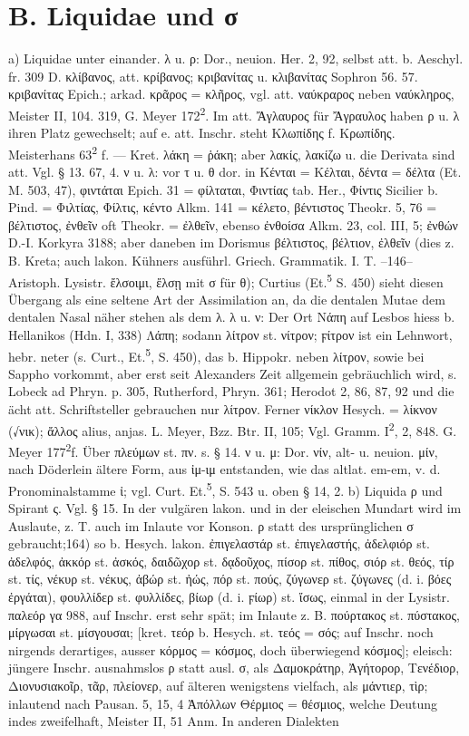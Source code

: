 \section{B. Liquidae und σ}
a) Liquidae unter einander. λ u. ρ: Dor., neuion. Her. 2, 92, selbst att. b. Aeschyl. fr. 309 D. κλίβανος, att. κρίβανος; κριβανίτας u. κλιβανίτας Sophron 56. 57. κριβανίτας Epich.; arkad. κρᾶρος = κλῆρος, vgl. att. ναύκραρος neben ναύκληρος, Meister II, 104. 319, G. Meyer 172\textsuperscript{2}. Im att. Ἄγλαυρος für Ἄγραυλος haben ρ u. λ ihren Platz gewechselt; auf e. att. Inschr. steht Κλωπίδης f. Κρωπίδης. Meisterhans 63\textsuperscript{2} f. — Kret. λάκη = ῥάκη; aber λακίς, λακίζω u. die Derivata sind att. Vgl. § 13. 67, 4. ν u. λ: vor τ u. θ dor. in Κένται = Κέλται, δέντα = δέλτα (Et. M. 503, 47), φιντάται Epich. 31 = φίλταται, Φιντίας tab. Her., Φίντις Sicilier b. Pind. = Φιλτίας, Φίλτις, κέντο Alkm. 141 = κέλετο, βέντιστος Theokr. 5, 76 = βέλτιστος, ἐνθεῖν oft Theokr. = ἐλθεῖν, ebenso ἐνθοίσα Alkm. 23, col. III, 5; ἐνθών D.-I. Korkyra 3188; aber daneben im Dorismus βέλτιστος, βέλτιον, ἐλθεῖν (dies z. B. Kreta; auch lakon. Kühners ausführl. Griech. Grammatik. I. T. --146-- Aristoph. Lysistr. ἔλσοιμι, ἔλσῃ mit σ für θ); Curtius (Et.\textsuperscript{5} S. 450) sieht diesen Übergang als eine seltene Art der Assimilation an, da die dentalen Mutae dem dentalen Nasal näher stehen als dem λ. λ u. ν: Der Ort Νάπη auf Lesbos hiess b. Hellanikos (Hdn. I, 338) Λάπη; sodann λίτρον st. νίτρον; ϝίτρον ist ein Lehnwort, hebr. neter (s. Curt., Et.\textsuperscript{5}, S. 450), das b. Hippokr. neben λίτρον, sowie bei Sappho vorkommt, aber erst seit Alexanders Zeit allgemein gebräuchlich wird, s. Lobeck ad Phryn. p. 305, Rutherford, Phryn. 361; Herodot 2, 86, 87, 92 und die ächt att. Schriftsteller gebrauchen nur λίτρον. Ferner νίκλον Hesych. = λίκνον (√νικ); ἄλλος alius, anjas. L. Meyer, Bzz. Btr. II, 105; Vgl. Gramm. I\textsuperscript{2}, 2, 848. G. Meyer 177\textsuperscript{2}f. Über πλεύμων st. πν. s. § 14. ν u. μ: Dor. νίν, alt- u. neuion. μίν, nach Döderlein ältere Form, aus ἰμ-ιμ entstanden, wie das altlat. em-em, v. d. Pronominalstamme ἰ; vgl. Curt. Et.\textsuperscript{5}, S. 543 u. oben § 14, 2. b) Liquida ρ und Spirant ς. Vgl. § 15. In der vulgären lakon. und in der eleischen Mundart wird im Auslaute, z. T. auch im Inlaute vor Konson. ρ statt des ursprünglichen σ gebraucht;164) so b. Hesych. lakon. ἐπιγελαστάρ st. ἐπιγελαστής, ἀδελφιόρ st. ἀδελφός, ἀκκόρ st. ἀσκός, δαιδῶχορ st. δᾳδοῦχος, πίσορ st. πίθος, σιόρ st. θεός, τίρ st. τίς, νέκυρ st. νέκυς, ἀβώρ st. ἠώς, πόρ st. πούς, ζύγωνερ st. ζύγωνες (d. i. βόες ἐργάται), φουλλίδερ st. φυλλίδες, βίωρ (d. i. ϝίωρ) st. ἴσως, einmal in der Lysistr. παλεόρ γα 988, auf Inschr. erst sehr spät; im Inlaute z. B. πούρτακος st. πύστακος, μίργωσαι st. μίσγουσαι; [kret. τεόρ b. Hesych. st. τεός = σός; auf Inschr. noch nirgends derartiges, ausser κόρμος = κόσμος, doch überwiegend κόσμος]; eleisch: jüngere Inschr. ausnahmslos ρ statt ausl. σ, als Δαμοκράτηρ, Ἀγήτορορ, Τενέδιορ, Διονυσιακοῖρ, τᾶρ, πλείονερ, auf älteren wenigstens vielfach, als μάντιερ, τὶρ; inlautend nach Pausan. 5, 15, 4 Ἀπόλλων Θέρμιος = θέσμιος, welche Deutung indes zweifelhaft, Meister II, 51 Anm. In anderen Dialekten 
